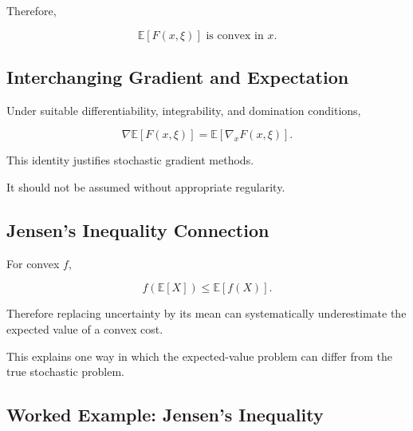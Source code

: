 Therefore,

\[
\boxed{
\mathbb{E}[F(x,\xi)]
\text{ is convex in }x.
}
\]

\subsection{Interchanging Gradient and Expectation}
\label{subsec:gradient-expectation-interchange}

Under suitable differentiability, integrability, and domination
conditions,

\[
\boxed{
\nabla
\mathbb{E}
[
F(x,\xi)
]
=
\mathbb{E}
[
\nabla_xF(x,\xi)
].
}
\]

This identity justifies stochastic gradient methods.

It should not be assumed without appropriate regularity.

\subsection{Jensen's Inequality Connection}
\label{subsec:jensen-stochastic-optimization}

For convex \(f\),

\[
\boxed{
f
(
\mathbb{E}[X]
)
\leq
\mathbb{E}
[
f(X)
].
}
\]

Therefore replacing uncertainty by its mean can systematically
underestimate the expected value of a convex cost.

This explains one way in which the expected-value problem can differ from
the true stochastic problem.

\subsection{Worked Example: Jensen's Inequality}
\label{subsec:worked-jensen-stochastic}

